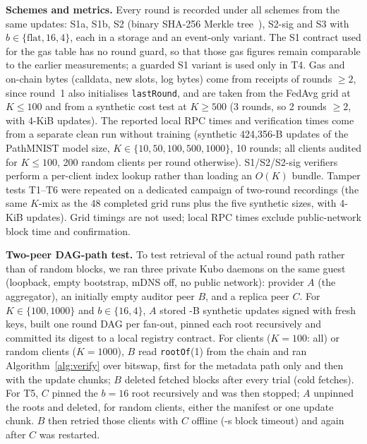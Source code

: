 \documentclass[final,3p,times,twocolumn]{elsarticle}
\newcommand{\Sa}{S1a}\newcommand{\Sb}{S1b}
\begin{document}
\textbf{Schemes and metrics.} Every round is recorded under all schemes from the same updates: \Sa, \Sb, S2 (binary SHA-256 Merkle tree~\cite{merkle}), S2-sig and S3 with $b\in\{\text{flat},16,4\}$, each in a storage and an event-only variant. The S1 contract used for the gas table has no round guard, so that those gas figures remain comparable to the earlier measurements; a guarded S1 variant is used only in T4. Gas and on-chain bytes (calldata, new slots, log bytes) come from receipts of rounds $\geq2$, since round~1 also initialises \texttt{lastRound}, and are taken from the FedAvg grid at $K\le100$ and from a synthetic cost test at $K\ge500$ (3 rounds, so 2 rounds $\geq2$, with 4-KiB updates). The reported local RPC times and verification times come from a separate clean run without training (synthetic 424,356-B updates of the PathMNIST model size, $K\in\{10,50,100,500,1000\}$, 10 rounds; all clients audited for $K\le100$, 200 random clients per round otherwise). S1/S2/S2-sig verifiers perform a per-client index lookup rather than loading an $O(K)$ bundle. Tamper tests T1--T6 were repeated on a dedicated campaign of  two-round recordings (the same $K$-mix as the 48 completed grid runs plus the five synthetic sizes, with 4-KiB updates). Grid timings are not used; local RPC times exclude public-network block time and confirmation.

\textbf{Two-peer DAG-path test.} To test retrieval of the actual round path rather than of random blocks, we ran three private Kubo daemons on the same guest (loopback, empty bootstrap, mDNS off, no public network): provider $A$ (the aggregator), an initially empty auditor peer $B$, and a replica peer $C$. For $K\in\{100,1000\}$ and $b\in\{16,4\}$, $A$ stored -B synthetic updates signed with fresh keys, built one round DAG per fan-out, pinned each root recursively and committed its digest to a local registry contract. For  clients ($K=100$: all) or  random clients ($K=1000$), $B$ read \texttt{rootOf}(1) from the chain and ran Algorithm~\ref{alg:verify} over bitswap, first for the metadata path only and then with the update chunks; $B$ deleted fetched blocks after every trial (cold fetches). For T5, $C$ pinned the $b=16$ root recursively and was then stopped; $A$ unpinned the roots and deleted, for  random clients, either the manifest or one update chunk. $B$ then retried those clients with $C$ offline (-s block timeout) and again after $C$ was restarted.
\end{document}
